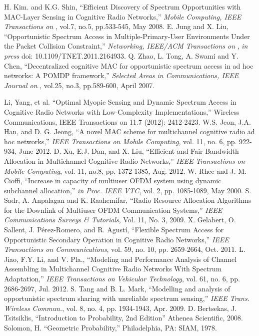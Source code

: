 \begin{thebibliography}{1}
 H. Kim. and K.G. Shin, ``Efficient Discovery of Spectrum Opportunities with MAC-Layer Sensing in Cognitive Radio Networks,'' \emph{Mobile Computing, IEEE Transactions on }, vol.7, no.5, pp.533-545, May 2008.
 E. Jung and X. Liu, ``Opportunistic Spectrum Access in Multiple-Primary-User Environments Under the Packet Collision Constraint,'' \emph{Networking, IEEE/ACM Transactions on }, \textit{in press} doi: 10.1109/TNET.2011.2164933.
 Q. Zhao, L. Tong, A. Swami and Y. Chen, ``Decentralized cognitive MAC for opportunistic spectrum access in ad hoc networks: A POMDP framework,'' \emph{Selected Areas in Communications, IEEE Journal on }, vol.25, no.3, pp.589-600, April 2007.

 Li, Yang, et al. ``Optimal Myopic Sensing and Dynamic Spectrum Access in Cognitive Radio Networks with Low-Complexity Implementations,'' Wireless Communications, IEEE Transactions on 11.7 (2012): 2412-2423.
 W.S. Jeon, J.A. Han, and D. G. Jeong, ``A novel MAC scheme for multichannel cognitive radio ad hoc networks,'' \emph{IEEE Transactions on Mobile Computing}, vol. 11, no. 6, pp. 922-934, June 2012.
 D. Xu, E.J. Dan, and X. Liu, ``Efficient and Fair Bandwidth Allocation in Multichannel Cognitive Radio Networks,'' \emph{IEEE Transactions on Mobile Computing}, vol. 11, no.8, pp. 1372-1385, Aug. 2012.
 W. Rhee and J. M. Cioffi, ``Increase in capacity of multiuser OFDM
system using dynamic subchannel allocation,'' \emph{in Proc. IEEE VTC}, vol. 2, pp. 1085-1089, May 2000.
 S. Sadr, A. Anpalagan and K. Raahemifar, ``Radio Resource Allocation Algorithms for the Downlink of Multiuser OFDM Communication Systems,'' \emph{IEEE Communications Surveys \& Tutorials}, Vol. 11, No. 3, 2009.
X. Gelabert, O. Sallent, J. Pérez-Romero, and R. Agustí, ``Flexible Spectrum Access for Opportunistic Secondary Operation in Cognitive Radio Networks,'' \emph{IEEE Transactions on Communications}, vol. 59, no. 10, pp. 2659-2664, Oct. 2011.
L. Jiao, F.Y. Li, and V. Pla., ``Modeling and Performance Analysis of Channel Assembling in Multichannel Cognitive Radio Networks With Spectrum Adaptation,'' \emph{IEEE Transactions on Vehicular Technology}, vol. 61, no. 6, pp. 2686-2697, Jul. 2012.
 S. Tang and B. L. Mark, ``Modelling and analysis of opportunistic spectrum sharing with unreliable spectrum sensing,'' \emph{IEEE Trans. Wireless Commun.}, vol. 8, no. 4, pp. 1934-1943, Apr. 2009.
D. Bertsekas, J. Tsitsiklis, ``Introduction to Probability, 2nd Edition'' Athenea Scientific, 2008. 
Solomon, H. ``Geometric Probability,'' Philadelphia, PA: SIAM, 1978.














\end{thebibliography}
